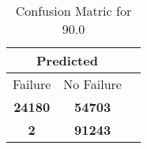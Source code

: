 \begin{table}[] 
\caption{Confusion Matric for 90.0} 
\label{Table: Prediction Accuracy-DMD90.0OnlySunEKF-ignoreReflection100.9EKF-top2-Reflection} 
\centering 
\begin{tabular} 
 {@{}ccc@{}} 
\toprule 
\multicolumn{2}{c}{\textbf{Predicted}}
 \\ \midrule 
\multicolumn{1}{|c|}{Failure} & 
\multicolumn{1}{c|}{No Failure}
 \\ \midrule 
\multicolumn{1}{|c|}{\color{green}\textbf{24180}} & 
\multicolumn{1}{c|}{\color{red}\textbf{54703}}
 \\ \midrule 
\multicolumn{1}{|c|}{\color{red}\textbf{2}} & 
\multicolumn{1}{c|}{\color{green}\textbf{91243}}
 \\ \bottomrule 
\end{tabular} 
\end{table} 
